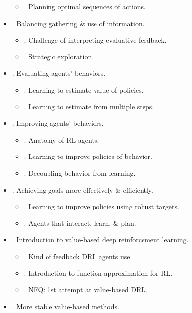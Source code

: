 \documentclass{article}
\begin{document}
\begin{itemize}
\begin{itemize}
        \item {. Planning optimal sequences of actions.}
    \end{itemize}
    \item {. Balancing gathering \& use of information.}
    \begin{itemize}
        \item {. Challenge of interpreting evaluative feedback.}
        \item {. Strategic exploration.}
    \end{itemize}
    \item {. Evaluating agents' behaviors.}
    \begin{itemize}
        \item {. Learning to estimate value of policies.}
        \item {. Learning to estimate from multiple steps.}
    \end{itemize}
    \item {. Improving agents' behaviors.}
    \begin{itemize}
        \item {. Anatomy of RL agents.}
        \item {. Learning to improve policies of behavior.}
        \item {. Decoupling behavior from learning.}
    \end{itemize}
    \item {. Achieving goals more effectively \& efficiently.}
    \begin{itemize}
        \item {. Learning to improve policies using robust targets.}
        \item {. Agents that interact, learn, \& plan.}
    \end{itemize}
    \item {. Introduction to value-based deep reinforcement learning.}
    \begin{itemize}
        \item {. Kind of feedback DRL agents use.}
        \item {. Introduction to function approximation for RL.}
        \item {. NFQ: 1st attempt at value-based DRL.}
    \end{itemize}
    \item {. More stable value-based methods.}
    \begin{itemize}

\end{itemize}
\end{itemize}
\end{document}
